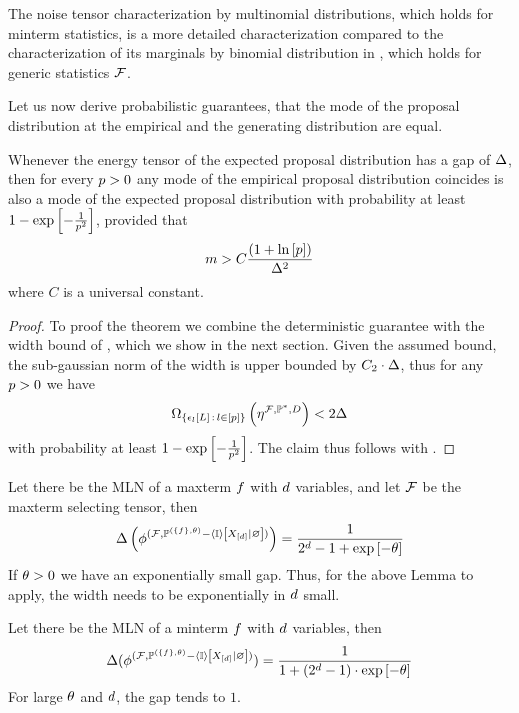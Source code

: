 The noise tensor characterization by multinomial distributions, which holds for minterm statistics, is a more detailed characterization compared to the characterization of its marginals by binomial distribution in , which holds for generic statistics $\mathcal{F}$.


Let us now derive probabilistic guarantees, that the mode of the proposal distribution at the empirical and the generating distribution are equal.

\begin{theorem}
    \label{the:probGuaranteeProposalDist}
    Whenever the energy tensor of the expected proposal distribution has a gap of $\Delta$, then for every $p>0$ any mode of the empirical proposal distribution coincides is also a mode of the expected proposal distribution with probability at least $1-\mathrm{exp}\left[-\frac{1}{p^2}\right]$, provided that
    \begin{align*}
        m > C\frac{(1+\ln \left[ p \right])}{\Delta^2}
    \end{align*}
    where $C$ is a universal constant.
\end{theorem}
\begin{proof}
    To proof the theorem we combine the deterministic guarantee  with the width bound of , which we show in the next section.
    Given the assumed bound, the sub-gaussian norm of the width is upper bounded by $C_2\cdot \Delta$, thus for any $p>0$ we have
    \begin{align*}
        \Omega_{\{\epsilon_{l}\left[L\right] \,:\, l\in[p] \}}\left(\eta^{\mathcal{F},\mathbb{P}^*,D}\right)  < 2 \Delta
    \end{align*}
    with probability at least $1-\mathrm{exp}\left[-\frac{1}{p^2}\right]$.
    The claim thus follows with .
\end{proof}


\begin{example}
    Let there be the MLN of a maxterm $f$ with $d$ variables, and let $\mathcal{F}$ be the maxterm selecting tensor, then
    \[ \Delta\left(
    \phi^{(\mathcal{F}, \mathbb{P}^{(\{f\},\theta)} - \left\langle \mathbb{I}\right\rangle \left[ X_{[d]} | \varnothing \right] )}
    \right) = \frac{1}{2^{d}-1 + \mathrm{exp}\left[-\theta\right]}  \]
    If $\theta>0$ we have an exponentially small gap.
    Thus, for the above Lemma to apply, the width needs to be exponentially in $d$ small.


    Let there be the MLN of a minterm $f$ with $d$ variables, then
    \[ \Delta(
    \phi^{(\mathcal{F}, \mathbb{P}^{(\{f\},\theta)} - \left\langle \mathbb{I}\right\rangle \left[ X_{[d]} | \varnothing \right] )}
    ) = \frac{1}{1+(2^{d}-1)\cdot\mathrm{exp}\left[-\theta\right]}  \]
    For large $\theta$ and $d$, the gap tends to $1$.
\end{example}

